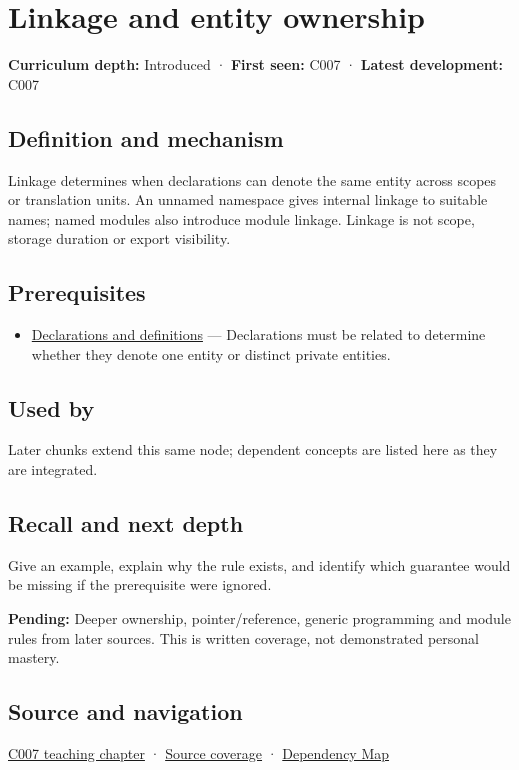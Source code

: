 \hypertarget{appendix-74a0ec818c18}{}\label{referencestart:appendix-74a0ec818c18}
\section{Linkage and entity ownership}\label{appendix-74a0ec818c18-linkage-and-entity-ownership}

\textbf{Curriculum depth:} Introduced · \textbf{First seen:} C007 · \textbf{Latest development:} C007

\subsection{Definition and mechanism}\label{appendix-74a0ec818c18-definition-and-mechanism}

Linkage determines when declarations can denote the same entity across scopes or translation units. An unnamed namespace gives internal linkage to suitable names; named modules also introduce module linkage. Linkage is not scope, storage duration or export visibility.

\subsection{Prerequisites}\label{appendix-74a0ec818c18-prerequisites}

\begin{itemize}
\tightlist
\item
  \hyperref[appendix-2e4d494c2d94]{Declarations and definitions} --- Declarations must be related to determine whether they denote one entity or distinct private entities.
\end{itemize}

\subsection{Used by}\label{appendix-74a0ec818c18-used-by}

Later chunks extend this same node; dependent concepts are listed here as they are integrated.

\subsection{Recall and next depth}\label{appendix-74a0ec818c18-recall-and-next-depth}

Give an example, explain why the rule exists, and identify which guarantee would be missing if the prerequisite were ignored.

\textbf{Pending:} Deeper ownership, pointer/reference, generic programming and module rules from later sources. This is written coverage, not demonstrated personal mastery.

\subsection{Source and navigation}\label{appendix-74a0ec818c18-source-and-navigation}

\hyperref[01-foundations-i-ch002-many-files-must-describe-one-coherent-program]{C007 teaching chapter} · \hyperref[appendix-fd090d982a15-m007---parts-101-112]{Source coverage} · \hyperref[appendix-4ad47bdd269a]{Dependency Map}
